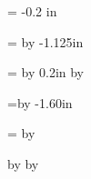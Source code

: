 \hfudge = -0.2 in


\newdimen \tempp
\tempp = \hcorner 
\advance\tempp by -1.125in
\setlength{\oddsidemargin}{\tempp} %
\setlength{\evensidemargin}{\oddsidemargin}

\tempp = \hlabel  \advance \tempp by 0.2in
\multiply \tempp by \ncols 
\setlength{\textwidth}{\tempp}

\tempp=\vcorner \advance \tempp by -1.60in
\setlength{\topmargin}{\tempp}%

\tempp = \vlabel \multiply\tempp by \nrows 

\setlength{\textheight}{\tempp}
\setlength{\headheight}{-.6in}
\setlength{\footheight}{0in}
\setlength{\baselineskip}{0in}
\setlength{\fboxsep}{0in}	%
\setlength{\parskip}{0in}
\setlength{\headsep}{0in}

\advance \vlabel by \vfudge
\advance \hlabel by \hfudge

\newcommand{\lb}[1]{
\fill 0.1in
\mbox{		\rule[-\vlabel]{0in}{\vlabel} %
		\begin{minipage}[t]{\hlabel}
			\begin{flushleft}
			{\sf #1}
			\end{flushleft}
		\end{minipage}
	}
}




\raggedbottom
\raggedright



